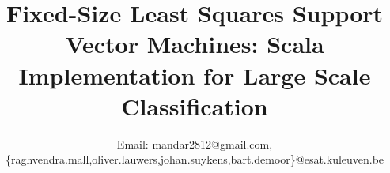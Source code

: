 \documentclass[conference, cmex10]{IEEEtran}
\begin{document}
%
\title{Fixed-Size Least Squares Support Vector Machines: Scala Implementation for Large Scale Classification}


\author{

Email: mandar2812@gmail.com,\{raghvendra.mall,oliver.lauwers,johan.suykens,bart.demoor\}@esat.kuleuven.be}

% 








\maketitle
\end{document}
